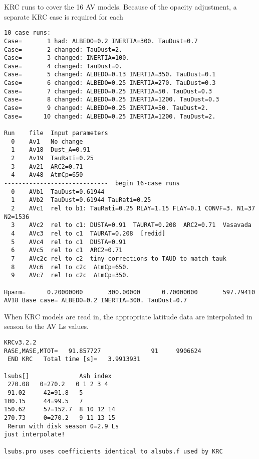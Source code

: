 \documentclass{article}
\begin{document}
\begin{table} \caption[KRC Runs]{KRC runs to cover the 16 AV models. Because of the opacity adjustment, a separate KRC case is required for each }  \label{cases}
\begin{verbatim}
10 case runs:
Case=       1 had: ALBEDO=0.2 INERTIA=300. TauDust=0.7 
Case=       2 changed: TauDust=2. 
Case=       3 changed: INERTIA=100. 
Case=       4 changed: TauDust=0. 
Case=       5 changed: ALBEDO=0.13 INERTIA=350. TauDust=0.1 
Case=       6 changed: ALBEDO=0.25 INERTIA=270. TauDust=0.3 
Case=       7 changed: ALBEDO=0.25 INERTIA=50. TauDust=0.3 
Case=       8 changed: ALBEDO=0.25 INERTIA=1200. TauDust=0.3 
Case=       9 changed: ALBEDO=0.25 INERTIA=50. TauDust=2. 
Case=      10 changed: ALBEDO=0.25 INERTIA=1200. TauDust=2. 

Run    file  Input parameters
  0    Av1   No change 
  1    Av18  Dust_A=0.91 
  2    Av19  TauRati=0.25 
  3    Av21  ARC2=0.71 
  4    Av48  AtmCp=650 
-----------------------------  begin 16-case runs
  0    AVb1  TauDust=0.61944 
  1    AVb2  TauDust=0.61944 TauRati=0.25 
  2    AVc1  rel to b1: TauRati=0.25 RLAY=1.15 FLAY=0.1 CONVF=3. N1=37 N2=1536
  3    AVc2  rel to c1: DUSTA=0.91  TAURAT=0.208  ARC2=0.71  Vasavada
  4    AVc3  rel to c1  TAURAT=0.208  [redid]
  5    AVc4  rel to c1  DUSTA=0.91
  6    AVc5  rel to c1  ARC2=0.71
  7    AVc2c rel to c2  tiny corrections to TAUD to match tauk
  8    AVc6  rel to c2c  AtmCp=650.
  9    AVc7  rel to c2c  AtmCp=350.
 
Hparm=      0.20000000       300.00000      0.70000000       597.79410
AV18 Base case= ALBEDO=0.2 INERTIA=300. TauDust=0.7 
\end{verbatim}
\vspace{-3.0mm}
\hrulefill \end{table}



When KRC models are read in, the appropriate latitude data are interpolated in season to the AV Ls values.

\vspace{-3.mm} 
\begin{verbatim}
KRCv3.2.2
RASE,MASE,MTOT=   91.857727              91     9906624
 END KRC   Total time [s]=   3.9913931 

lsubs[]              Ash index
 270.08   0=270.2   0 1 2 3 4 
 91.02     42=91.8   5
100.15     44=99.5   7
150.62     57=152.7  8 10 12 14
270.73     0=270.2   9 11 13 15
 Rerun with disk season 0=2.9 Ls
just interpolate!

lsubs.pro uses coefficients identical to alsubs.f used by KRC 
\end{verbatim} 
\end{document}
